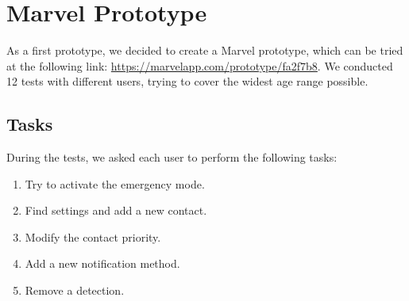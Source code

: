 \documentclass[12pt]{article}
\begin{document}
\section{Marvel Prototype}
As a first prototype, we decided to create a Marvel prototype, which can be tried 
at the following link: \url{https://marvelapp.com/prototype/fa2f7b8}. 
We conducted 12 tests with different users, trying to cover the widest 
age range possible. 

\subsection{Tasks}
During the tests, we asked each user to perform the following tasks:
\begin{enumerate}
    \item Try to activate the emergency mode. 
    \item Find settings and add a new contact.
    \item Modify the contact priority.
    \item Add a new notification method.
    \item Remove a detection.
\end{enumerate}
\end{document}
